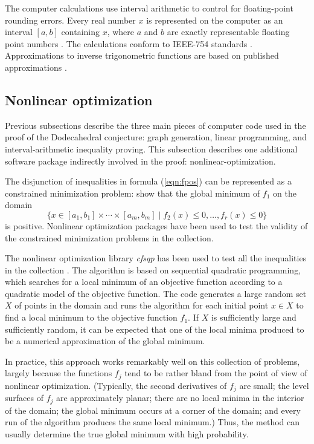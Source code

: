 \documentclass{article} %
\begin{document}
The computer calculations use interval arithmetic to control for
floating-point rounding errors. Every real number $x$ is represented
on the computer as an interval $[a,b]$ containing $x$, where $a$ and
$b$ are exactly representable floating point numbers
\cite{Alefeld:1983:Interval, Press:1992:NumericalRecipes}. The
calculations conform to IEEE-754 standards \cite{IEEE:1985:IEE754}.
Approximations to inverse trigonometric functions are based on
published approximations \cite{Hart:1968:Approximations}.

\subsection{Nonlinear optimization}

Previous subsections describe the three main pieces of computer code
used in the proof of the Dodecahedral conjecture: graph generation,
linear programming, and interval-arithmetic inequality proving. This
subsection describes one additional software package indirectly
involved in the proof: nonlinear-optimization. 

The disjunction of inequalities in formula (\ref{eqn:fpos}) can
be represented as a constrained minimization problem: show that
the global minimum of $f_1$ on the domain
$$
\{x\in[a_1,b_1]\times\cdots\times[a_m,b_m] \mid  f_2(x)\le 0,\ldots,
  f_r(x)\le 0 \}
$$
is positive. Nonlinear optimization packages have been
used to test the validity of the constrained minimization
problems in the collection.

The nonlinear optimization library \emph{cfsqp} has been used to test
all the inequalities in the collection \cite{Lawrence:1997:CFSQP}. The
algorithm is based on sequential quadratic programming, which searches
for a local minimum of an objective function according to a quadratic
model of the objective function. The code generates a large random set
$X$ of points in the domain and runs the algorithm for each initial
point $x\in X$ to find a local minimum to the objective function
$f_1$. If $X$ is sufficiently large and sufficiently random, it can be
expected that one of the local minima produced to be a numerical
approximation of the global minimum.

In practice, this approach works remarkably well on this
collection of problems, largely because the functions $f_j$
tend to be rather bland from the point of view of nonlinear
optimization.  (Typically, the second derivatives of $f_j$
are small; the level surfaces of $f_j$ are approximately planar;
there are no local minima in the interior of the domain;
the global minimum occurs at a corner of the domain; and
every run of the algorithm produces the same local minimum.)
Thus, the method can usually determine the true global minimum with
high probability.
\end{document}
